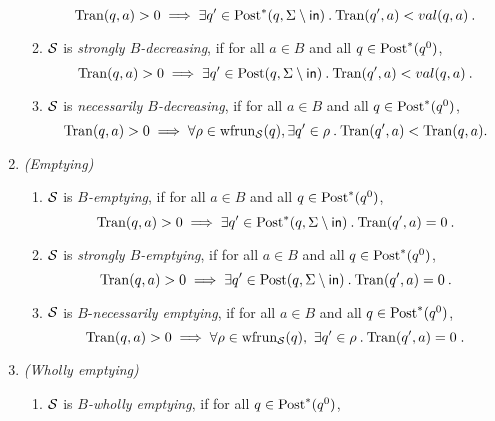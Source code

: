 \begin{definition}
\begin{enumerate}[label=P\arabic*:, ref=(P\arabic*), leftmargin=*]
\begin{enumerate}[label=\alph*), ref=(P\arabic{enumi}.\alph*), leftmargin=*, itemsep=1pt]
                \[ 
                    \val(q,a)>0 \implies \exists q' \in \post^*(q,\Sigma\setminus \inset)\: .\:\val(q',a)<val(q,a)\: .
                \]   
                \item\label{def:cp:str-decreasing}$\S$ is \emph{strongly $B$-decreasing},  if for all $a \in B$ and all $q \in \post^*(q^0)$,
                \[ 
                    \val(q,a)>0 \implies \exists q' \in \post(q,\Sigma\setminus \inset)\: .\:\val(q',a)<val(q,a)\: .
                \]           
                 \item\label{def:cp:nec-decreasing}$\S$ is \emph{necessarily $B$-decreasing},  if for all $a \in B$ and all $q \in \post^*(q^0)$,
                \[
                    \val(q,a)>0 \implies \forall \rho \in \frun{\S}(q),\exists q' \in \rho\:.\: \val(q',a)<\val(q,a).
                \]
            \end{enumerate}    
        \item\label{def:cp:emptying} \emph{(Emptying)}
            \begin{enumerate}[label=\alph*), ref=(P\arabic{enumi}.\alph*), leftmargin=*, itemsep=1pt]
                \item\label{def:cp:bas-emptying} $\S$ is \emph{$B$-emptying},  if for all $a \in B$ and all $q \in \post^*(q^0)$,
                \[
                    \val(q,a)>0 \implies \exists q' \in \post^*(q,\Sigma\setminus \inset)\: .\:\val(q',a)=0\: .
                \]
                \item\label{def:cp:str-emptying} $\S$ is \emph{strongly $B$-emptying},  if for all $a \in B$ and all $q \in \post^*(q^0)$,
                \[
                    \val(q,a)>0 \implies \exists q' \in \post(q,\Sigma\setminus \inset)\: .\: \val(q',a)=0\: .
                \]
                \item\label{def:cp:nec-emptying} $\S$ is $B$-\emph{necessarily emptying},  if for all $a \in B$ and all $q \in \post^*(q^0)$,
                \[
                    \val(q,a)>0 \implies \forall \rho \in \frun{\S}(q),\ \exists q' \in \rho\: .\: \val(q',a)=0 \;.
                \]
            \end{enumerate}
        \item\label{def:cp:wholly-emptying} \emph{(Wholly emptying)}
            \begin{enumerate}[label=\alph*), ref=(P\arabic{enumi}.\alph*), leftmargin=*, itemsep=2pt]
                \item\label{def:cp:bas-wholly-emptying} $\S$ is \emph{$B$-wholly emptying}, if for all $q \in \post^*(q^0)$,

\end{enumerate}
\end{enumerate}
\end{definition}

